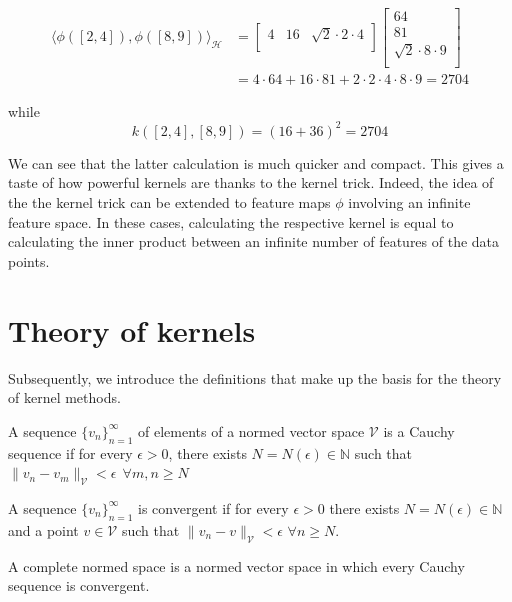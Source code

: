 $$
\begin{aligned}
\langle \phi([2,4]),\phi([8,9]) \rangle_{\mathcal{H}}&=  \left[ {\begin{array}{cccc}
    4 & 16 &     \sqrt{2}\cdot 2 \cdot 4\\
  \end{array} } \right]
  \left[ {\begin{array}{cccc}
    64\\
    81\\
    \sqrt{2}\cdot8 \cdot 9
    \\
  \end{array} } \right]\\ &=4\cdot 64 +16\cdot 81 +2 \cdot 2 \cdot 4 \cdot 8 \cdot 9=2704
\end{aligned}
$$

while $$k([2,4], [8,9])=(16+36)^2=2704$$

We can see that the latter calculation is much quicker and compact.
This gives a taste of how powerful kernels are thanks to the kernel trick.
Indeed, the idea of the the kernel trick can be extended to feature maps
$\phi$ involving an infinite feature space. In these cases, calculating the
respective kernel is equal to calculating the inner product between an infinite
number of features of the data points.

\section{Theory of kernels}
Subsequently, we introduce the definitions that make up the basis for the theory of kernel methods.

\begin{definition}
    A sequence $\{v_n\}_{n=1}^{\infty}$ of elements of a normed vector space $\mathcal{V}$ is a Cauchy sequence if for every $\epsilon>0$, there exists $N=N(\epsilon) \in \mathbb{N}$ such that $\|v_n-v_m\|_{\mathcal{V}}<\epsilon \ \ \forall m,n\geq N$  
\end{definition}

\begin{definition}
    A sequence $\{v_n\}_{n=1}^{\infty}$ is convergent if for every $\epsilon>0$ there exists $N=N(\epsilon) \in \mathbb{N}$ and a point $ v \in \mathcal{V}$ such that  $\|v_n-v\|_{\mathcal{V}} < \epsilon$ $\forall n\geq N$.
\end{definition}

\begin{definition}
    A complete normed space is a normed vector space in which every Cauchy sequence is convergent.
\end{definition}


